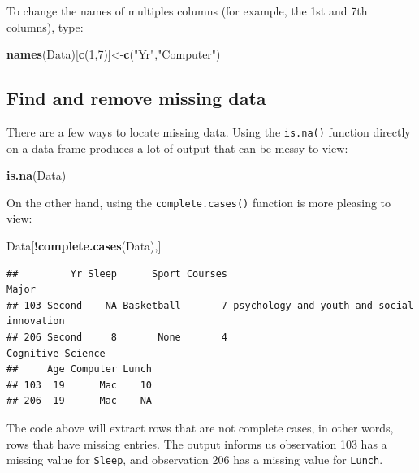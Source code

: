 \documentclass[
]{book}
\newenvironment{Shaded}{\begin{snugshade}}{\end{snugshade}}
\newcommand{\DecValTok}[1]{\textcolor[rgb]{0.00,0.00,0.81}{#1}}
\newcommand{\FunctionTok}[1]{\textcolor[rgb]{0.13,0.29,0.53}{\textbf{#1}}}
\newcommand{\NormalTok}[1]{#1}
\newcommand{\OtherTok}[1]{\textcolor[rgb]{0.56,0.35,0.01}{#1}}
\newcommand{\SpecialCharTok}[1]{\textcolor[rgb]{0.81,0.36,0.00}{\textbf{#1}}}
\newcommand{\StringTok}[1]{\textcolor[rgb]{0.31,0.60,0.02}{#1}}
\begin{document}
To change the names of multiples columns (for example, the 1st and 7th columns), type:

\begin{Shaded}
\begin{Highlighting}[]
\FunctionTok{names}\NormalTok{(Data)[}\FunctionTok{c}\NormalTok{(}\DecValTok{1}\NormalTok{,}\DecValTok{7}\NormalTok{)]}\OtherTok{\textless{}{-}}\FunctionTok{c}\NormalTok{(}\StringTok{"Yr"}\NormalTok{,}\StringTok{"Computer"}\NormalTok{)}
\end{Highlighting}
\end{Shaded}

\hypertarget{find-and-remove-missing-data}{%
\subsection{Find and remove missing data}\label{find-and-remove-missing-data}}

There are a few ways to locate missing data. Using the \texttt{is.na()} function directly on a data frame produces a lot of output that can be messy to view:

\begin{Shaded}
\begin{Highlighting}[]
\FunctionTok{is.na}\NormalTok{(Data)}
\end{Highlighting}
\end{Shaded}

On the other hand, using the \texttt{complete.cases()} function is more pleasing to view:

\begin{Shaded}
\begin{Highlighting}[]
\NormalTok{Data[}\SpecialCharTok{!}\FunctionTok{complete.cases}\NormalTok{(Data),]}
\end{Highlighting}
\end{Shaded}

\begin{verbatim}
##         Yr Sleep      Sport Courses                                      Major
## 103 Second    NA Basketball       7 psychology and youth and social innovation
## 206 Second     8       None       4                          Cognitive Science
##     Age Computer Lunch
## 103  19      Mac    10
## 206  19      Mac    NA
\end{verbatim}

The code above will extract rows that are not complete cases, in other words, rows that have missing entries. The output informs us observation 103 has a missing value for \texttt{Sleep}, and observation 206 has a missing value for \texttt{Lunch}.
\end{document}
